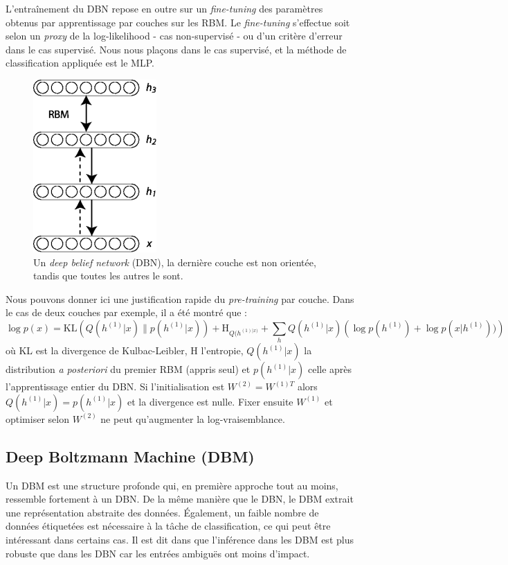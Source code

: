 \documentclass[10pt,a4paper]{article}
\begin{document}
L'entraînement du DBN repose en outre sur un \emph{fine-tuning} des paramètres obtenus par apprentissage par couches sur les RBM. Le \emph{fine-tuning} s'effectue soit selon un \emph{proxy} de la log-likelihood - cas non-supervisé - ou d'un critère d'erreur dans le cas supervisé. Nous nous plaçons dans le cas supervisé, et la méthode de classification appliquée est le MLP.

\begin{figure}[ht!]
\centering
\includegraphics[width = .3\columnwidth]{fig/DBN3.png}
\caption{Un \emph{deep belief network} (DBN), la dernière couche est non orientée, tandis que toutes les autres le sont.}
\label{fig4}
\end{figure}

Nous pouvons donner ici une justification rapide du \emph{pre-training} par couche. Dans le cas de deux couches par exemple, il a été montré \cite{DBLP:bibsonomy_HintonSalakhutdinov2006b} que :
\begin{equation}
\log p(x) = \text{KL}(Q(h^{(1)}|x) \| p(h^{(1)}|x)) + \text{H}_{Q(h^{(1)|x)}} + \sum_h Q(h^{(1)}|x) \left( \log p(h^{(1)}) + \log p(x | h^{(1)}))\right)
\end{equation}
où KL est la divergence de Kulbac-Leibler, H l'entropie, $Q(h^{(1)}|x)$ la distribution \emph{a posteriori} du premier RBM (appris seul) et $p(h^{(1)}|x)$ celle après l'apprentissage entier du DBN. Si l'initialisation est $W^{(2)} = W^{{(1)}T}$ alors $Q(h^{(1)}|x) = p(h^{(1)}|x)$ et la divergence est nulle. Fixer ensuite $W^{(1)}$ et optimiser selon $W^{(2)}$ ne peut qu'augmenter la log-vraisemblance.




\subsection{Deep Boltzmann Machine (DBM)}

Un DBM est une structure profonde qui,  en première approche tout au moins, ressemble fortement à un DBN. De la même manière que le DBN, le DBM extrait une représentation abstraite des données. Également, un faible nombre de données étiquetées est nécessaire à la tâche de classification, ce qui peut être intéressant dans certains cas. Il est dit dans \cite{SalHinton07} que l'inférence dans les DBM est plus robuste que dans les DBN car les entrées ambiguës ont moins d'impact. 
\end{document}
